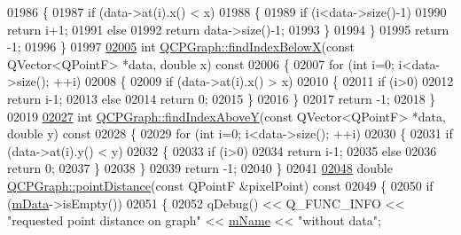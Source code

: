 \begin{DoxyCode}
01986   \{
01987     \textcolor{keywordflow}{if} (data->at(i).x() < x)
01988     \{
01989       \textcolor{keywordflow}{if} (i<data->size()-1)
01990         \textcolor{keywordflow}{return} i+1;
01991       \textcolor{keywordflow}{else}
01992         \textcolor{keywordflow}{return} data->size()-1;
01993     \}
01994   \}
01995   \textcolor{keywordflow}{return} -1;
01996 \}
01997 
\hypertarget{a00115_source_l02005}{}\hyperlink{a00031_a6f4e9461d5925be9228fc4760249a04f}{02005} \textcolor{keywordtype}{int} \hyperlink{a00031_a6f4e9461d5925be9228fc4760249a04f}{QCPGraph::findIndexBelowX}(\textcolor{keyword}{const} QVector<QPointF> *data, \textcolor{keywordtype}{double} x)\textcolor{keyword}{ const}
02006 \textcolor{keyword}{}\{
02007   \textcolor{keywordflow}{for} (\textcolor{keywordtype}{int} i=0; i<data->size(); ++i)
02008   \{
02009     \textcolor{keywordflow}{if} (data->at(i).x() > x)
02010     \{
02011       \textcolor{keywordflow}{if} (i>0)
02012         \textcolor{keywordflow}{return} i-1;
02013       \textcolor{keywordflow}{else}
02014         \textcolor{keywordflow}{return} 0;
02015     \}
02016   \}
02017   \textcolor{keywordflow}{return} -1;
02018 \}
02019 
\hypertarget{a00115_source_l02027}{}\hyperlink{a00031_adf50243f1df203883a2187089734bfcb}{02027} \textcolor{keywordtype}{int} \hyperlink{a00031_adf50243f1df203883a2187089734bfcb}{QCPGraph::findIndexAboveY}(\textcolor{keyword}{const} QVector<QPointF> *data, \textcolor{keywordtype}{double} y)\textcolor{keyword}{ const}
02028 \textcolor{keyword}{}\{
02029   \textcolor{keywordflow}{for} (\textcolor{keywordtype}{int} i=0; i<data->size(); ++i)
02030   \{
02031     \textcolor{keywordflow}{if} (data->at(i).y() < y)
02032     \{
02033       \textcolor{keywordflow}{if} (i>0)
02034         \textcolor{keywordflow}{return} i-1;
02035       \textcolor{keywordflow}{else}
02036         \textcolor{keywordflow}{return} 0;
02037     \}
02038   \}
02039   \textcolor{keywordflow}{return} -1;
02040 \}
02041 
\hypertarget{a00115_source_l02048}{}\hyperlink{a00031_af93762a12a481a7edb4b3dd9e330dff1}{02048} \textcolor{keywordtype}{double} \hyperlink{a00031_af93762a12a481a7edb4b3dd9e330dff1}{QCPGraph::pointDistance}(\textcolor{keyword}{const} QPointF &pixelPoint)\textcolor{keyword}{ const}
02049 \textcolor{keyword}{}\{
02050   \textcolor{keywordflow}{if} (\hyperlink{a00031_a8457c840f69a0ac49f61d30a509c5d08}{mData}->isEmpty())
02051   \{
02052     qDebug() << Q\_FUNC\_INFO << \textcolor{stringliteral}{"requested point distance on graph"} << \hyperlink{a00024_ac29ffef424e2488675930de18cde612a}{mName} << \textcolor{stringliteral}{"without data"};

\end{DoxyCode}
